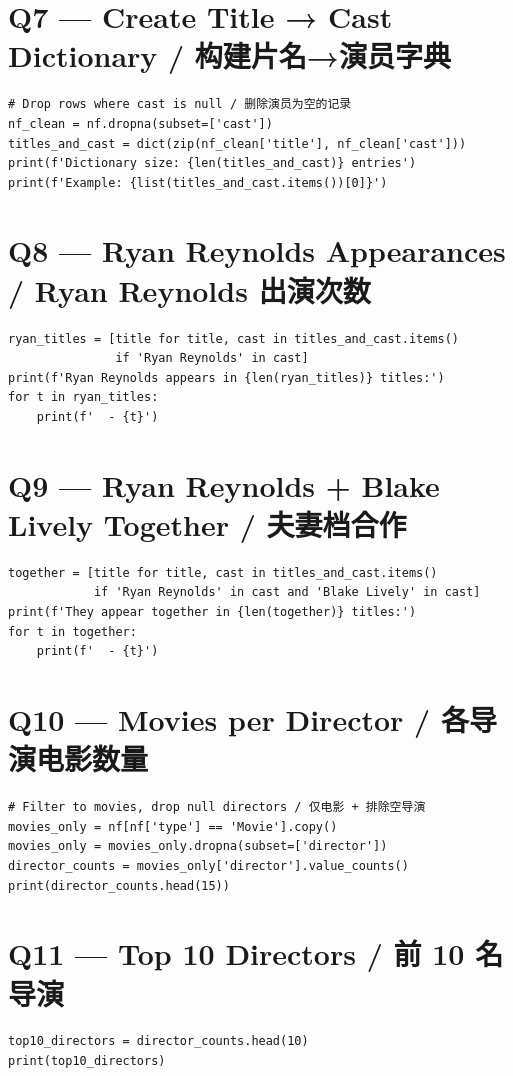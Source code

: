 \documentclass[11pt,a4paper]{report}
\begin{document}
\section*{Q7 — Create Title → Cast Dictionary / 构建片名→演员字典}
\begin{lstlisting}
# Drop rows where cast is null / 删除演员为空的记录
nf_clean = nf.dropna(subset=['cast'])
titles_and_cast = dict(zip(nf_clean['title'], nf_clean['cast']))
print(f'Dictionary size: {len(titles_and_cast)} entries')
print(f'Example: {list(titles_and_cast.items())[0]}')
\end{lstlisting}

\section*{Q8 — Ryan Reynolds Appearances / Ryan Reynolds 出演次数}
\begin{lstlisting}
ryan_titles = [title for title, cast in titles_and_cast.items()
               if 'Ryan Reynolds' in cast]
print(f'Ryan Reynolds appears in {len(ryan_titles)} titles:')
for t in ryan_titles:
    print(f'  - {t}')
\end{lstlisting}

\section*{Q9 — Ryan Reynolds + Blake Lively Together / 夫妻档合作}
\begin{lstlisting}
together = [title for title, cast in titles_and_cast.items()
            if 'Ryan Reynolds' in cast and 'Blake Lively' in cast]
print(f'They appear together in {len(together)} titles:')
for t in together:
    print(f'  - {t}')
\end{lstlisting}

\section*{Q10 — Movies per Director / 各导演电影数量}
\begin{lstlisting}
# Filter to movies, drop null directors / 仅电影 + 排除空导演
movies_only = nf[nf['type'] == 'Movie'].copy()
movies_only = movies_only.dropna(subset=['director'])
director_counts = movies_only['director'].value_counts()
print(director_counts.head(15))
\end{lstlisting}

\section*{Q11 — Top 10 Directors / 前 10 名导演}
\begin{lstlisting}
top10_directors = director_counts.head(10)
print(top10_directors)
\end{lstlisting}
\end{document}
